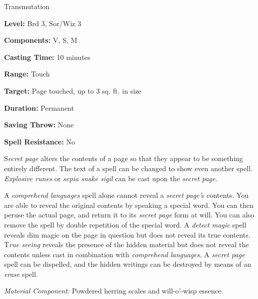 
Transmutation

\textbf{Level:} Brd 3, Sor/Wiz 3

\textbf{Components:} V, S, M

\textbf{Casting Time:} 10 minutes

\textbf{Range:} Touch

\textbf{Target:} Page touched, up to 3 sq. ft. in size

\textbf{Duration:} Permanent

\textbf{Saving Throw:} None

\textbf{Spell Resistance:} No

S\textit{ecret page} alters the contents of a page so that they appear to be something 
entirely different. The text of a spell can be changed to show even another spell. 
\textit{Explosive runes} or \textit{sepia snake sigil} can be cast upon the \textit{secret 
page}.

A \textit{comprehend languages} spell alone cannot reveal a \textit{secret page'}s 
contents. You are able to reveal the original contents by speaking a special word. 
You can then peruse the actual page, and return it to its \textit{secret page} form 
at will. You can also remove the spell by double repetition of the special word. 
A \textit{detect magic} spell reveals dim magic on the page in question but does 
not reveal its true contents. T\textit{rue seeing} reveals the presence of the 
hidden material but does not reveal the contents unless cast in combination with 
\textit{comprehend languages}. A \textit{secret page} spell can be dispelled, and 
the hidden writings can be destroyed by means of an \textit{erase} spell.

\textit{Material Component:} Powdered herring scales and will-o'-wisp essence.

